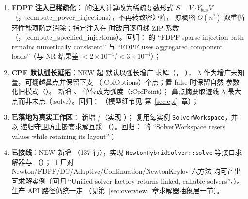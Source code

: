 \begin{enumerate}
        “Power-flow result declares its converter model scope”，:TEST\_CASE("Power-flow result declares its converter model scope")）；
  \item \textbf{FDPF 注入已稀疏化}：
        的注入计算改为稀疏复数形式 $S=V\cdot\overline{Y_{bus}V}$
        （，:compute\_power\_injections），不再转致密矩阵，
        原稠密 $O(n^2)$ 双重循环性能项随之消除；指定注入在
         时改用逐母线 ZIP 系数
        （，:compute\_specified\_injections）。回归：
         的 “FDPF sparse injection
        path remains numerically consistent” 与 “FDPF uses aggregated
        component loads”（与 NR 结果差 $<2\times10^{-4}$/$<3\times10^{-4}$）；
  \item \textbf{CPF 默认弧长延拓}：NEW 起  默认以弧长增广
        求解（，
        ），
        $\lambda$ 作为增广未知量，可翻越鼻点并保留下支
        （:CpfOptions）个点；置 false 时保留自然
        参数化旧模式（）。
         新增 、 单位改为弧度（:CpfPoint）；
        鼻点摘要取迹线 $\lambda$ 最大点而非末点（:solve）。回归：
        （模型细节见
        第~\ref{sec:cpf}~章）；
  \item \textbf{ 已落地为真实工作区}：
         新增
        /（实现
        ）；
         复用每实例 \texttt{SolverWorkspace}，并以
         递归守卫防止嵌套求解互踩
        （）。回归：
         的 “SolverWorkspace resets
        values while retaining its layout”；
  \item \textbf{ 已接线}：NEW 新增
        （137 行），实现
        \texttt{NewtonHybridSolver::solve} 等接口求解器与
        （）；
        工厂对 Newton/FDPF/DC/Adaptive/Continuation/NewtonKrylov 六方法
        均可产出可求解实例（回归 “Unified solver factory returns linked,
        callable solvers”，）。
        生产 API 路径仍统一走 
        （见第~\ref{sec:overview}~章求解器抽象层一节）。
\end{enumerate}

